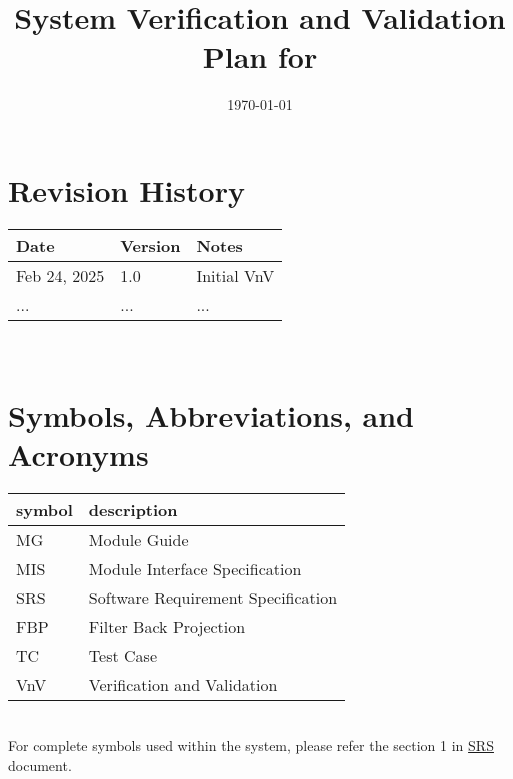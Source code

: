 \documentclass[12pt, titlepage]{article}
\begin{document}
\title{System Verification and Validation Plan for \progname{}}
\author{\authname}
\date{\today}
\maketitle


\section*{Revision History}

\begin{tabularx}{\textwidth}{p{3cm}p{2cm}X}
\toprule {\bf Date} & {\bf Version} & {\bf Notes}\\
\midrule
Feb 24, 2025 & 1.0 & Initial VnV\\
... & ... & ...\\
\bottomrule
\end{tabularx}

~\\

\newpage

\tableofcontents

\listoftables


\newpage

\section{Symbols, Abbreviations, and Acronyms}

\renewcommand{\arraystretch}{1.2}
\begin{tabular}{l l}
  \toprule
  \textbf{symbol} & \textbf{description}\\
  \midrule
  MG & Module Guide \\
  MIS & Module Interface Specification \\
  SRS & Software Requirement Specification\\
  FBP & Filter Back Projection \\
  TC & Test Case \\
  VnV & Verification and Validation \\
  \bottomrule
\end{tabular}\\

For complete symbols used within the system, please refer the section 1 in
  \href{https://github.com/marischan888/Computed-Tomography-Image-Reconstruction/blob/main/docs/SRS/SRS.pdf}{SRS}
  document.
\end{document}
